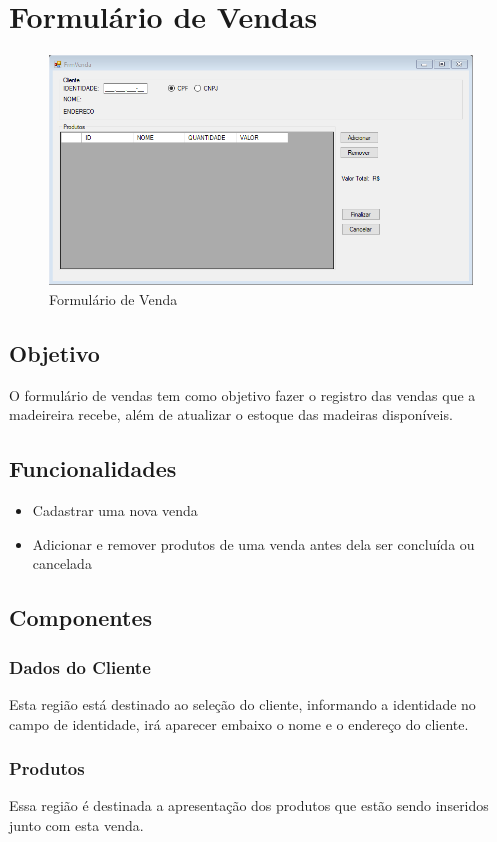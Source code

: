 \documentclass[
	article,			%
	12pt,				%
	oneside,			%
	a4paper,			%
	english,			%
	brazil,				%
	sumario=tradicional
	]{abntex2}
\begin{document}
	\section{Formulário de Vendas}
	\begin{figure}[!htb]
		\centering
		\includegraphics[scale=0.7]{../Figuras/FrmVenda.png}
		\caption{Formulário de Venda}
	\end{figure}
	\subsection{Objetivo}
	O formulário de vendas tem como objetivo fazer o registro das vendas que a madeireira recebe, além de atualizar o estoque das madeiras disponíveis.  
	\subsection{Funcionalidades}
	\begin{itemize}
		\item Cadastrar uma nova venda
		\item Adicionar e remover produtos de uma venda antes dela ser concluída ou cancelada
	\end{itemize}
	\subsection{Componentes}
	\subsubsection{Dados do Cliente}
	Esta região está destinado ao seleção do cliente, informando a identidade no campo de identidade, irá aparecer embaixo o nome e o endereço do cliente.
	\subsubsection{Produtos}
	Essa região é destinada a apresentação dos produtos que estão sendo inseridos junto com esta venda.
\end{document}
